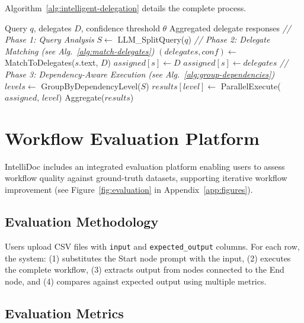 \documentclass[11pt]{article}
\begin{document}
Algorithm~\ref{alg:intelligent-delegation} details the complete process.

\begin{algorithm}[t]
\caption{Intelligent Delegation}
\label{alg:intelligent-delegation}
\begin{algorithmic}[1]
\REQUIRE Query $q$, delegates $D$, confidence threshold $\theta$
\ENSURE Aggregated delegate responses
\STATE \textit{// Phase 1: Query Analysis}
\STATE $S \leftarrow$ LLM\_SplitQuery($q$)
\STATE {}
\STATE
\STATE \textit{// Phase 2: Delegate Matching (see Alg.~\ref{alg:match-delegates})}
    \STATE $(delegates, conf) \leftarrow$ MatchToDelegates($s$.text, $D$)
        \STATE $assigned[s] \leftarrow D$ 
    \ELSE
        \STATE $assigned[s] \leftarrow delegates$
    \ENDIF
\ENDFOR
\STATE
\STATE \textit{// Phase 3: Dependency-Aware Execution (see Alg.~\ref{alg:group-dependencies})}
\STATE $levels \leftarrow$ GroupByDependencyLevel($S$)
    \STATE $results[level] \leftarrow$ ParallelExecute($assigned$, $level$)
\ENDFOR
\RETURN Aggregate($results$)
\end{algorithmic}
\end{algorithm}


\section{Workflow Evaluation Platform}
\label{sec:evaluation}

IntelliDoc includes an integrated evaluation platform enabling users to assess workflow quality against ground-truth datasets, supporting iterative workflow improvement (see Figure~\ref{fig:evaluation} in Appendix~\ref{app:figures}).

\subsection{Evaluation Methodology}

Users upload CSV files with \texttt{input} and \texttt{expected\_output} columns. For each row, the system: (1) substitutes the Start node prompt with the input, (2) executes the complete workflow, (3) extracts output from nodes connected to the End node, and (4) compares against expected output using multiple metrics.

\subsection{Evaluation Metrics}
\end{document}
